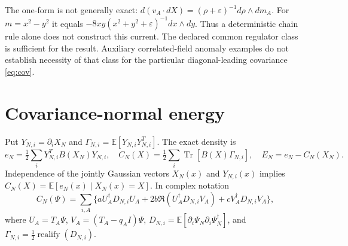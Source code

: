 \documentclass[11pt]{article}
\newcommand{\E}{\mathbb E}
\newcommand{\tr}{\operatorname{Tr}}
\newcommand{\eps}{\varepsilon}
\begin{document}
The one-form is not generally exact:
$d(v_A\cdot dX)=(\rho+\eps)^{-1}d\rho\wedge dm_A$.
For $m=x^2-y^2$ it equals $-8xy(x^2+y^2+\eps)^{-1}dx\wedge dy$.
Thus a deterministic chain rule alone does not construct this current.
The declared common regulator class is sufficient for the result. Auxiliary
correlated-field anomaly examples do not establish necessity of that class
for the particular diagonal-leading covariance \eqref{eq:cov}.

\section{Covariance-normal energy}
Put $Y_{N,i}=\partial_iX_N$ and
$\Gamma_{N,i}=\E[Y_{N,i}Y_{N,i}^T]$. The exact density is
\begin{equation}\label{eq:energy}
 e_N=\tfrac12\sum_iY_{N,i}^TB(X_N)Y_{N,i},\quad
 C_N(X)=\tfrac12\sum_i\tr[B(X)\Gamma_{N,i}],\quad E_N=e_N-C_N(X_N).
\end{equation}
Independence of the jointly Gaussian vectors $X_N(x)$ and $Y_{N,i}(x)$
implies $C_N(X)=\E[e_N(x)\mid X_N(x)=X]$. In complex notation
\begin{equation}\label{eq:complexct}
 C_N(\Psi)=\sum_{i,A}\{aU_A^\dagger D_{N,i}U_A
 +2b\Re(U_A^\dagger D_{N,i}V_A)+cV_A^\dagger D_{N,i}V_A\},
\end{equation}
where $U_A=T_A\Psi$, $V_A=(T_A-q_AI)\Psi$,
$D_{N,i}=\E[\partial_i\Psi_N\partial_i\Psi_N^\dagger]$, and
$\Gamma_{N,i}=\tfrac12\operatorname{realify}(D_{N,i})$.
\end{document}
